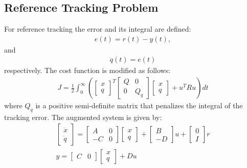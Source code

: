 \subsection*{Reference Tracking Problem}
For reference tracking the error and its integral are defined:
\begin{align*}
e(t) = r(t) - y(t),
\end{align*}
and
\begin{align*}
\dot{q}(t)= e(t)
\end{align*}
respectively. The cost function is modified as follows:
\begin{align*}
J=\frac{1}{2}\int_{0}^{\infty} \left(\begin{bmatrix}x\\q
\end{bmatrix}^T\begin{bmatrix}Q & 0\\0 & Q_q
\end{bmatrix}\begin{bmatrix}x\\q
\end{bmatrix} + u^T R u \right) d t
\end{align*}
where $Q_q$ is a positive semi-definite matrix that penalizes the integral of the tracking error. The augmented system is given by:
\begin{align*}
\begin{bmatrix}\dot{x}\\\dot{q}
\end{bmatrix}=\begin{bmatrix}A & 0\\-C & 0
\end{bmatrix}\begin{bmatrix}x\\q
\end{bmatrix}+\begin{bmatrix}B\\-D
\end{bmatrix}u+\begin{bmatrix}0\\I
\end{bmatrix}r\\
y=\begin{bmatrix}C & 0\end{bmatrix}\begin{bmatrix}x\\q
\end{bmatrix}+Du
\end{align*}

